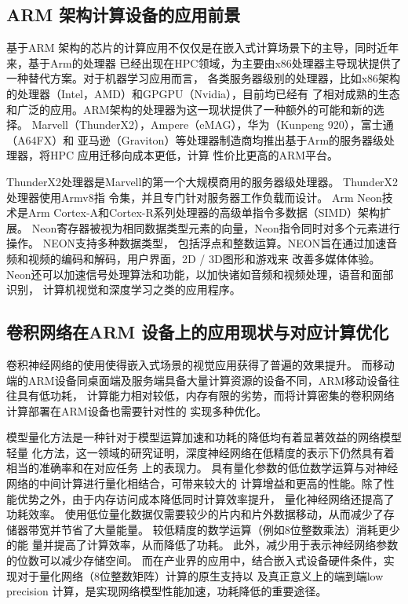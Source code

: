 \subsection{ARM 架构计算设备的应用前景}
基于ARM 架构的芯片的计算应用不仅仅是在嵌入式计算场景下的主导，同时近年来，基于Arm的处理器
已经出现在HPC领域，为主要由x86处理器主导现状提供了一种替代方案。对于机器学习应用而言，
各类服务器级别的处理器，比如x86架构的处理器（Intel，AMD）和GPGPU（Nvidia），目前均已经有
了相对成熟的生态和广泛的应用。ARM架构的处理器为这一现状提供了一种额外的可能和新的选择。
Marvell（ThunderX2），Ampere（eMAG），华为（Kunpeng 920），富士通（A64FX）和
亚马逊（Graviton）等处理器制造商均推出基于Arm的服务器级处理器，将HPC 应用迁移向成本更低，计算
性价比更高的ARM平台。

ThunderX2处理器是Marvell的第一个大规模商用的服务器级处理器。 ThunderX2处理器使用Armv8指
令集，并且专门针对服务器工作负载而设计。 Arm Neon技术是Arm Cortex-A和Cortex-R系列处理器的高级单指令多数据（SIMD）架构扩展。
Neon寄存器被视为相同数据类型元素的向量，Neon指令同时对多个元素进行操作。 NEON支持多种数据类型，
包括浮点和整数运算。NEON旨在通过加速音频和视频的编码和解码，用户界面，2D / 3D图形和游戏来
改善多媒体体验。 Neon还可以加速信号处理算法和功能，以加快诸如音频和视频处理，语音和面部识别，
计算机视觉和深度学习之类的应用程序。

\subsection{卷积网络在ARM 设备上的应用现状与对应计算优化}

卷积神经网络的使用使得嵌入式场景的视觉应用获得了普遍的效果提升。
而移动端的ARM设备同桌面端及服务端具备大量计算资源的设备不同，ARM移动设备往往具有低功耗，
计算能力相对较低，内存有限的劣势，而将计算密集的卷积网络计算部署在ARM设备也需要针对性的
实现多种优化。

模型量化方法是一种针对于模型运算加速和功耗的降低均有着显著效益的网络模型轻量
化方法，这一领域的研究证明，深度神经网络在低精度的表示下仍然具有着相当的准确率和在对应任务
上的表现力。 具有量化参数的低位数学运算与对神经网络的中间计算进行量化相结合，可带来较大的
计算增益和更高的性能。除了性能优势之外，由于内存访问成本降低同时计算效率提升，
量化神经网络还提高了功耗效率。 使用低位量化数据仅需要较少的片内和片外数据移动，从而减少了存
储器带宽并节省了大量能量。 较低精度的数学运算（例如8位整数乘法）消耗更少的能
量并提高了计算效率，从而降低了功耗。 此外，减少用于表示神经网络参数的位数可以减少存储空间。
而在产业界的应用中，结合嵌入式设备硬件条件，实现对于量化网络（8位整数矩阵）计算的原生支持以
及真正意义上的端到端low precision 计算，是实现网络模型性能加速，功耗降低的重要途径。

